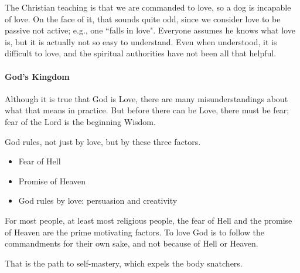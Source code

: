 The Christian teaching is that we are commanded to love, so a dog is incapable of love. On the face of it, that sounds quite odd, since we consider love to be passive not active; e.g., one ``falls in love". Everyone assumes he knows what love is, but it is actually not so easy to understand. Even when understood, it is difficult to love, and the spiritual authorities have not been all that helpful.

\paragraph{God's Kingdom}
Although it is true that God is Love, there are many misunderstandings about what that means in practice. But before there can be Love, there must be fear; fear of the Lord is the beginning Wisdom.

God rules, not just by love, but by these three factors.

\begin{itemize}
\item Fear of Hell 
\item Promise of Heaven 
\item God rules by love: persuasion and creativity 
\end{itemize}
For most people, at least most religious people, the fear of Hell and the promise of Heaven are the prime motivating factors. To love God is to follow the commandments for their own sake, and not because of Hell or Heaven.

That is the path to self-mastery, which expels the body snatchers.



